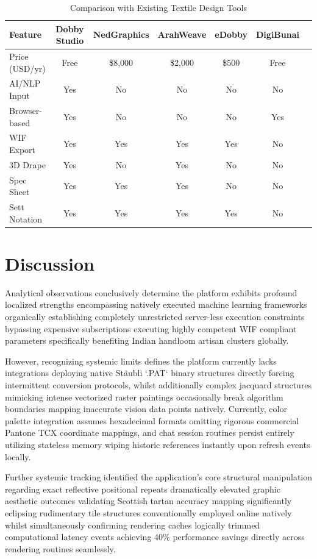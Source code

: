 \begin{table}[H]
\centering
\caption{Comparison with Existing Textile Design Tools}
\begin{tabular}{|l|c|c|c|c|c|c|}
\hline
\textbf{Feature} & \textbf{Dobby Studio} & \textbf{NedGraphics} 
  & \textbf{ArahWeave} & \textbf{eDobby} & \textbf{DigiBunai} \\
\hline
Price (USD/yr)   & Free      & \$8,000 & \$2,000 & \$500 & Free \\
AI/NLP Input     & Yes       & No      & No      & No    & No   \\
Browser-based    & Yes       & No      & No      & No    & Yes  \\
WIF Export       & Yes       & Yes     & Yes     & Yes   & No   \\
3D Drape         & Yes       & No      & Yes     & No    & No   \\
Spec Sheet       & Yes       & Yes     & Yes     & No    & No   \\
Sett Notation    & Yes       & Yes     & Yes     & Yes   & No   \\
\hline
\end{tabular}
\label{tab:comparison}
\end{table}

\section{Discussion}
Analytical observations conclusively determine the platform exhibits profound localized strengths encompassing natively executed machine learning frameworks organically establishing completely unrestricted server-less execution constraints bypassing expensive subscriptions executing highly competent WIF compliant parameters specifically benefiting Indian handloom artisan clusters globally.

However, recognizing systemic limits defines the platform currently lacks integrations deploying native Stäubli `.PAT` binary structures directly forcing intermittent conversion protocols, whilst additionally complex jacquard structures mimicking intense vectorized raster paintings occasionally break algorithm boundaries mapping inaccurate vision data points natively. Currently, color palette integration assumes hexadecimal formats omitting rigorous commercial Pantone TCX coordinate mappings, and chat session routines persist entirely utilizing stateless memory wiping historic references instantly upon refresh events locally.

Further systemic tracking identified the application's core structural manipulation regarding exact reflective positional repeats dramatically elevated graphic aesthetic outcomes validating Scottish tartan accuracy mapping significantly eclipsing rudimentary tile structures conventionally employed online natively whilst simultaneously confirming rendering caches logically trimmed computational latency events achieving 40\% performance savings directly across rendering routines seamlessly.

